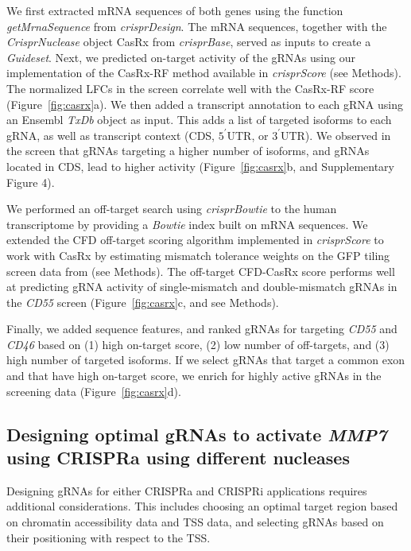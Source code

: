 \documentclass[pdftex,english,10pt]{article}
\begin{document}
We first extracted mRNA sequences of both genes using the function \textit{getMrnaSequence} from \textit{crisprDesign}. 
The mRNA sequences, together with the \textit{CrisprNuclease} object CasRx from \textit{crisprBase}, served as inputs to create a \textit{Guideset}.
Next, we predicted on-target activity of the gRNAs using our implementation of the CasRx-RF method \citep{wessels2020massively} available in \textit{crisprScore} (see Methods). The normalized LFCs in the screen correlate well with the CasRx-RF score (Figure~\ref{fig:casrx}a). We then added a transcript annotation to each gRNA using an Ensembl \textit{TxDb} object as input. This adds a list of targeted isoforms to each gRNA, as well as transcript context (CDS, $5^{\prime}$UTR, or $3^{\prime}$UTR). We observed in the screen that gRNAs targeting a higher number of isoforms, and gRNAs located in CDS, lead to higher activity (Figure~\ref{fig:casrx}b, and Supplementary Figure 4). 

We performed an off-target search using \textit{crisprBowtie} to the human transcriptome by providing a \textit{Bowtie} index built on mRNA sequences.
We extended the CFD off-target scoring algorithm implemented in \textit{crisprScore} to work with CasRx by estimating mismatch tolerance weights on the GFP tiling screen data from \citet{wessels2020massively} (see Methods). The off-target CFD-CasRx score performs well at predicting gRNA activity of single-mismatch and double-mismatch gRNAs in the \textit{CD55} screen (Figure~\ref{fig:casrx}c, and see Methods).  

Finally, we added sequence features, and ranked gRNAs for targeting \textit{CD55} and \textit{CD46} based on (1) high on-target score, (2) low number of off-targets, and (3) high number of targeted isoforms. If we select gRNAs that target a common exon and that have high on-target score, we enrich for highly active gRNAs in the screening data (Figure~\ref{fig:casrx}d). 






\subsection*{Designing optimal gRNAs to activate \textit{MMP7} using CRISPRa using different nucleases}

Designing gRNAs for either CRISPRa and CRISPRi applications requires additional considerations. This includes choosing an optimal target region based on chromatin accessibility data and TSS data, and selecting gRNAs based on their positioning with respect to the TSS. 
\end{document}
